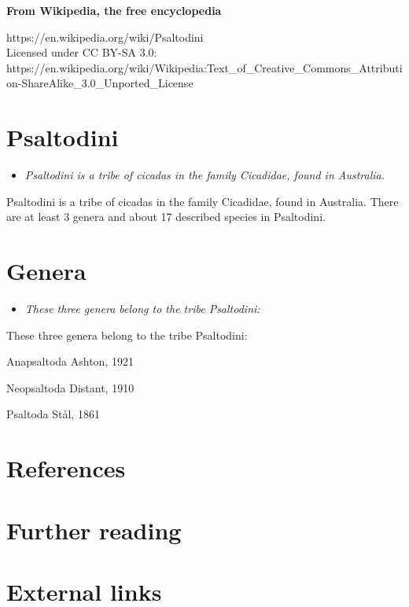 \textbf{From Wikipedia, the free encyclopedia}

https://en.wikipedia.org/wiki/Psaltodini\\
Licensed under CC BY-SA 3.0:\\
https://en.wikipedia.org/wiki/Wikipedia:Text\_of\_Creative\_Commons\_Attribution-ShareAlike\_3.0\_Unported\_License

\section{Psaltodini}\label{psaltodini}

\begin{itemize}
\item
  \emph{Psaltodini is a tribe of cicadas in the family Cicadidae, found
  in Australia.}
\end{itemize}

Psaltodini is a tribe of cicadas in the family Cicadidae, found in
Australia. There are at least 3 genera and about 17 described species in
Psaltodini.

\section{Genera}\label{genera}

\begin{itemize}
\item
  \emph{These three genera belong to the tribe Psaltodini:}
\end{itemize}

These three genera belong to the tribe Psaltodini:

Anapsaltoda Ashton, 1921

Neopsaltoda Distant, 1910

Psaltoda Stål, 1861

\section{References}\label{references}

\section{Further reading}\label{further-reading}

\section{External links}\label{external-links}
